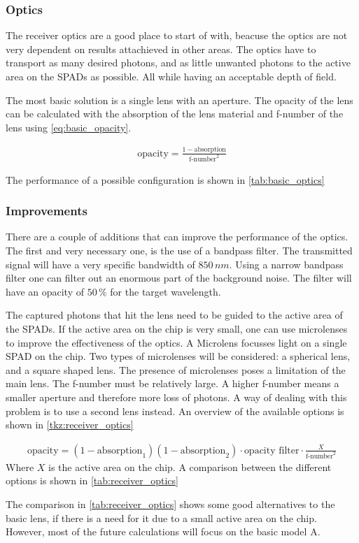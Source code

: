 \subsubsection{Optics}
The receiver optics are a good place to start of with, beacuse the optics are not very dependent on results attachieved in other areas. The optics have to transport as many desired photons, and as little unwanted photons to the active area on the SPADs as possible. All while having an acceptable depth of field. 

The most basic solution is a single lens with an aperture. The opacity of the lens can be calculated with the absorption of the lens material and f-number of the lens using \cref{eq:basic_opacity}.

\begin{align}\label{eq:basic_opacity}
\text{opacity} = \frac{1-\text{absorption}}{\text{f-number}^2}
\end{align}

 The performance of a possible configuration is shown in \cref{tab:basic_optics}



\subsubsection*{Improvements}
There are a couple of additions that can improve the performance of the optics. The first and very necessary one, is the use of a bandpass filter. The transmitted signal will have a very specific bandwidth of $850\,nm$. Using a narrow bandpass filter one can filter out an enormous part of the background noise. The filter will have an opacity of $50\,\%$ for the target wavelength.

The captured photons that hit the lens need to be guided to the active area of the SPADs. If the active area on the chip is very small, one can use microlenses to improve the effectiveness of the optics. A Microlens focusses light on a single SPAD on the chip. Two types of microlenses will be considered: a spherical lens, and a square shaped lens. The presence of microlenses poses a limitation of the main lens. The f-number must be relatively large. A higher f-number means a smaller aperture and therefore more loss of photons. A way of dealing with this problem is to use a second lens instead. An overview of the available options is shown in \cref{tkz:receiver_optics}



\begin{align}
\text{opacity} = (1-\text{absorption}_1)(1-\text{absorption}_2)\cdot\text{opacity filter}\cdot \frac{X}{\text{f-number}^2}
\end{align}
Where $X$ is the active area on the chip. A comparison between the different options is shown in \cref{tab:receiver_optics}



The comparison in \cref{tab:receiver_optics} shows some good alternatives to the basic lens, if there is a need for it due to a small active area on the chip. However, most of the future calculations will focus on the basic model A.

